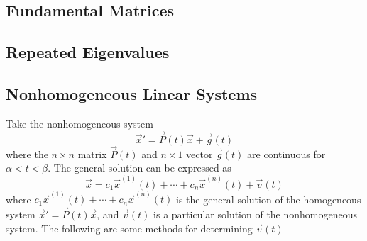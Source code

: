 \documentclass[10pt]{report}
\begin{document}
\subsection{Fundamental Matrices}
\subsection{Repeated Eigenvalues}
\subsection{Nonhomogeneous Linear Systems}
Take the nonhomogeneous system
$$\vec{x}' = \vec{P}(t)\vec{x} + \vec{g}(t)$$
where the $n\times n$ matrix $\vec{P}(t)$ and $n\times 1$ vector $\vec{g}(t)$ are continuous for $\alpha <t < \beta$. The general solution can be expressed as 
$$\vec{x} = c_1\vec{x}^{(1)}(t) + \cdots + c_n\vec{x}^{(n)}(t) + \vec{v}(t)$$
where $c_1\vec{x}^{(1)}(t) + \cdots + c_n\vec{x}^{(n)}(t)$ is the general solution of the homogeneous system $\vec{x}' = \vec{P}(t)\vec{x}$, and $\vec{v}(t)$ is a particular solution of the nonhomogeneous system. The following are some methods for determining $\vec{v}(t)$
\end{document}
